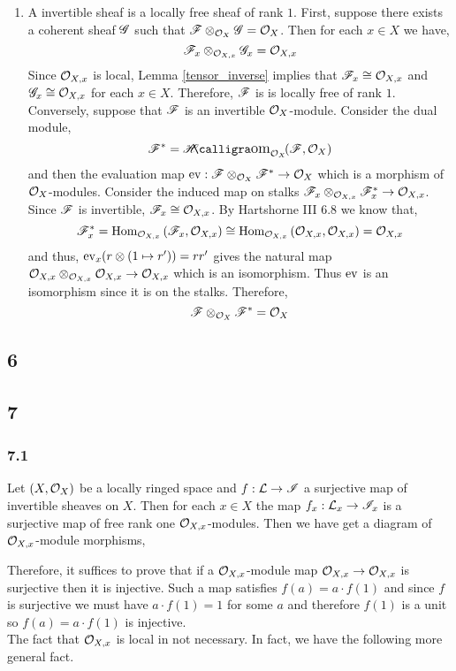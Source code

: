 \documentclass[12pt]{article}
\begin{document}
\begin{enumerate}
\item A invertible sheaf is a locally free sheaf of rank $1$. First, suppose there exists a coherent sheaf $\mathscr{G}$ such that $\mathscr{F} \otimes_{\mathcal{O}_{X}} \mathscr{G} = \mathcal{O}_{X}$. Then for each $x \in X$ we have,
\[ \mathscr{F}_x \otimes_{\mathcal{O}_{X, x}} \mathscr{G}_x = \mathcal{O}_{X, x} \]
Since $\mathcal{O}_{X, x}$ is local, Lemma \ref{tensor_inverse} implies that $\mathscr{F}_x \cong \mathcal{O}_{X, x}$ and $\mathscr{G}_x \cong \mathcal{O}_{X, x}$ for each $x \in X$. Therefore, $\mathscr{F}$ is is locally free of rank $1$.
\bigskip\\
Conversely, suppose that $\mathscr{F}$ is an invertible $\mathcal{O}_{X}$-module. Consider the dual module,
\[ \F^* = \shHom{\struct{X}}{\F}{\struct{X}} \]
and then the evaluation map $\mathrm{ev} : \mathscr{F} \otimes_{\mathcal{O}_{X}} \mathscr{F}^* \to \mathcal{O}_{X}$ which is a morphism of $\mathcal{O}_{X}$-modules.
Consider the induced map on stalks $\mathscr{F}_x \otimes_{\mathcal{O}_{X, x}} \mathscr{F}^*_x \to \mathcal{O}_{X, x}$. Since $\mathscr{F}$ is invertible, $\mathscr{F}_x \cong \mathcal{O}_{X, x}$. By Hartshorne III 6.8 we know that,
\[ \mathscr{F}^*_x = \mathrm{Hom}_{\mathcal{O}_{X, x}} \left( \mathscr{F}_x, \mathcal{O}_{X, x} \right) \cong \mathrm{Hom}_{\mathcal{O}_{X, x}} \left( \mathcal{O}_{X, x}, \mathcal{O}_{X, x} \right) = \mathcal{O}_{X, x} \] and thus, $\mathrm{ev}_x(r \otimes (1 \mapsto r')) = rr'$ gives the natural map $\mathcal{O}_{X, x} \otimes_{\mathcal{O}_{X, x}} \mathcal{O}_{X, x} \to \mathcal{O}_{X, x}$ which is an isomorphism. Thus $\mathrm{ev}$ is an isomorphism since it is on the stalks. Therefore, 
\[ \mathscr{F} \otimes_{\mathcal{O}_{X}} \mathscr{F}^* = \mathcal{O}_{X} \]
\end{enumerate}

\subsection{6}

\subsection{7}

\subsubsection{7.1}

Let $(X, \mathcal{O}_{X})$ be a locally ringed space and $f : \mathcal{L} \to \mathscr{I}$ a surjective map of invertible sheaves on $X$. Then for each $x \in X$ the map $f_x : \mathcal{L}_x \to \mathscr{I}_x$ is a surjective map of free rank one $\mathcal{O}_{X, x}$-modules. Then we have get a diagram of $\mathcal{O}_{X, x}$-module morphisms,
\begin{center}
\end{center}
Therefore, it suffices to prove that if a $\mathcal{O}_{X, x}$-module map $\mathcal{O}_{X, x} \to \mathcal{O}_{X, x}$ is surjective then it is injective. Such a map satisfies $f(a) = a \cdot f(1)$ and since $f$ is surjective we must have $a \cdot f(1) = 1$ for some $a$ and therefore $f(1)$ is a unit so $f(a) = a \cdot f(1)$ is injective.
\bigskip\\
The fact that $\mathcal{O}_{X, x}$ is local in not necessary. In fact, we have the following more general fact.
\end{document}
